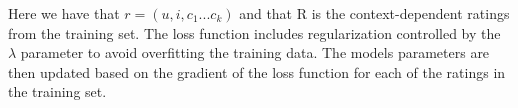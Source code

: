 Here we have that $r = (u,i,c_1...c_k)$ and that R is the context-dependent ratings from the training set.
The loss function includes regularization controlled by the $\lambda$ parameter to avoid overfitting the training data.
The models parameters are then updated based on the gradient of the loss function for each of the ratings in the training set.